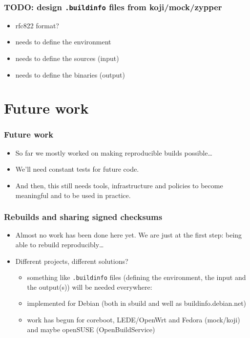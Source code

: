 \documentclass[14pt]{beamer}
\begin{document}
\begin{frame}
 \frametitle{TODO: design \texttt{.buildinfo} files from koji/mock/zypper}
 \begin{itemize}
  \item rfc822 format?
  \item needs to define the environment
  \item needs to define the sources (input)
  \item needs to define the binaries (output)
 \end{itemize}
\end{frame}



\section{Future work}

\begin{frame}
 \frametitle{Future work}
 \begin{itemize}
 \item<1-3> So far we mostly worked on making reproducible builds possible…
 \item<2-3> We'll need constant tests for future code.
 \item<3> And then, this still needs tools, infrastructure and policies to become
 meaningful and to be used in practice.
 \end{itemize}
\end{frame}

\begin{frame}
 \frametitle{Rebuilds and sharing signed checksums}
 \begin{itemize}
  \item Almost no work has been done here yet. We are just at the first step:
  being able to rebuild reproducibly…
  \item Different projects, different solutions?
 \begin{itemize}
  \item<2> something like \texttt{.buildinfo} files (defining the environment,
  the input and the output(s)) will be needed everywhere:
  \item<2> implemented for Debian (both in sbuild and well as
  buildinfo.debian.net)
  \item<2> work has begun for coreboot, LEDE/OpenWrt and Fedora (mock/koji)
  and maybe openSUSE (OpenBuildService)
 \end{itemize}
 \end{itemize}
\end{frame}
\end{document}
